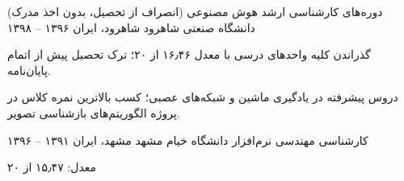 

\begin{cventries}

  \cventry
    {دوره‌های کارشناسی ارشد هوش مصنوعی (انصراف از تحصیل، بدون اخذ مدرک)} %
    {دانشگاه صنعتی شاهرود} %
    {شاهرود، ایران} %
    {۱۳۹۶ -- ۱۳۹۸} %
    {
      \begin{cvitems} %
      	\item {گذراندن کلیه واحدهای درسی با معدل ۱۶٫۴۶ از ۲۰؛ ترک تحصیل پیش از اتمام پایان‌نامه.}
      	\item {دروس پیشرفته در یادگیری ماشین و شبکه‌های عصبی؛ کسب بالاترین نمره کلاس در پروژه الگوریتم‌های بازشناسی تصویر.}
      \end{cvitems}
    }

    \cventry
    {کارشناسی مهندسی نرم‌افزار} %
    {دانشگاه خیام مشهد} %
    {مشهد، ایران} %
    {۱۳۹۱ -- ۱۳۹۶} %
    {
    \begin{cvitems} %
    	\item {معدل: ۱۵٫۴۷ از ۲۰}
    \end{cvitems}
    }

\end{cventries}
